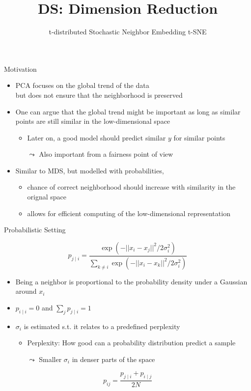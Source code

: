 \documentclass[aspectratio=169]{../latex_main/tntbeamer}  %
\title[Introduction]{DS: Dimension Reduction}
\subtitle{t-distributed Stochastic Neighbor Embedding t-SNE}
\begin{document}
	
	\maketitle
	\begin{frame}[c]{Motivation}
	    
	    \begin{itemize}
	        \item PCA focuses on the global trend of the data\\
	        but does not ensure that the neighborhood is preserved
	        \pause
	        \item One can argue that the global trend might be important as long as similar points are still similar in the low-dimensional space
	        \begin{itemize}
	            \item Later on, a good model should predict similar $y$ for similar points
	            \item[$\leadsto$] Also important from a fairness point of view
	        \end{itemize}
	        \pause
	        \item Similar to MDS, but modelled with probabilities,
	        \begin{itemize}
	            \item chance of correct neighborhood should increase with similarity in the orignal space
	            \item allows for efficient computing of the low-dimensional representation
	        \end{itemize}
	    \end{itemize}
	    
	\end{frame}
	
	\begin{frame}[c]{Probabilistic Setting}
	    
	    $$ p_{j\mid i } = \frac{\exp(- || x_i - x_j||^2 / 2\sigma_i^2)}{\sum_{k\neq i}  \exp(- || x_i - x_k||^2 / 2\sigma_i^2) } $$
	    
	    \begin{itemize}
	        \item Being a neighbor is proportional to the probability density under a Gaussian around $x_i$
	        \item $p_{i\mid i} = 0$ and $\sum_j p_{j\mid i} = 1$
	        \item $\sigma_i$ is estimated s.t. it relates to a predefined perplexity
	        \begin{itemize}
	            \item Perplexity: How good can a probability distribution predict a sample
	            \item[$\leadsto$] Smaller $\sigma_i$ in denser parts of the space
	        \end{itemize}
	    \end{itemize}
	    
	    \pause
	    
	    $$ p_{ij} = \frac{p_{j\mid i} + p_{i\mid j}}{2N}$$
	    
	\end{frame}
	
\end{document}
